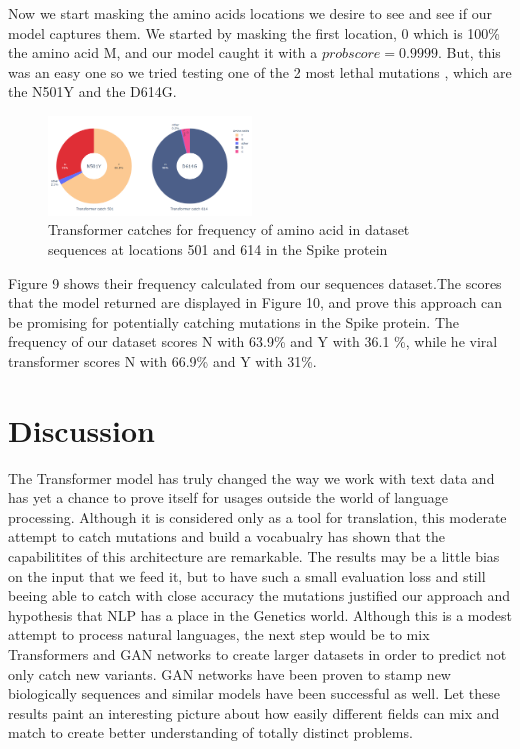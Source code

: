 \documentclass[conference,compsoc]{IEEEtran}
\begin{document}
Now we start masking the amino acids locations we desire to see and see if our model captures them. We started by masking the first location, 0 which is 100\% the amino acid M, and our model caught it with a $prob score=0.9999$. But, this was an easy one so we tried testing one of the 2 most lethal mutations \cite{ref27}, which are the N501Y and the D614G. 

\begin{figure}[h]
    \centering
    \includegraphics[width=0.48\textwidth]{images/fig10-freq_transformer.png}
    \caption{Transformer catches for frequency of amino acid in dataset sequences at locations 501 and 614 in the Spike protein}
    \label{fig10}
\end{figure}


Figure 9 shows their frequency calculated from our sequences dataset.The scores that the model returned are displayed in Figure 10, and prove this approach can be promising for potentially catching mutations in the Spike protein. The frequency of our dataset scores N with 63.9\% and Y with 36.1 \%, while he viral transformer scores N with 66.9\% and Y with 31\%. 


\section{Discussion}
The Transformer model has truly changed the way we work with text data and has yet a chance to prove itself for usages outside the world of language processing. Although it is considered only as a tool for translation, this moderate attempt to catch mutations and build a vocabualry has shown that the capabilitites of this architecture are remarkable. The results may be a little bias on the input that we feed it, but to have such a small evaluation loss and still beeing able to catch with close accuracy the mutations justified our approach and hypothesis that NLP has a place in the Genetics world. Although this is a modest attempt to process natural languages, the next step would be to mix Transformers and GAN networks \cite{ref28} to create larger datasets in order to predict not only catch new variants. GAN networks have been proven to stamp new biologically sequences \cite{ref29} and similar models have been successful as well. Let these results paint an  interesting picture about how  easily different fields can mix and match to create better understanding of totally distinct problems. 
\end{document}
